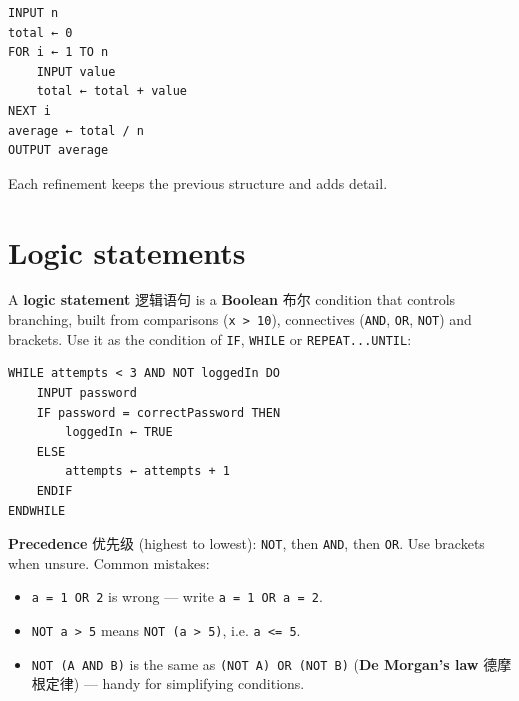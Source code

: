 \documentclass[11pt]{article}
\begin{document}
\begin{Verbatim}
INPUT n
total ← 0
FOR i ← 1 TO n
    INPUT value
    total ← total + value
NEXT i
average ← total / n
OUTPUT average
\end{Verbatim}

Each refinement keeps the previous structure and adds detail.

\section*{Logic statements}

A \textbf{logic statement} 逻辑语句 is a \textbf{Boolean} 布尔 condition that controls branching, built from comparisons (\texttt{x \textgreater{} 10}), connectives (\texttt{AND}, \texttt{OR}, \texttt{NOT}) and brackets. Use it as the condition of \texttt{IF}, \texttt{WHILE} or \texttt{REPEAT...UNTIL}:

\begin{Verbatim}
WHILE attempts < 3 AND NOT loggedIn DO
    INPUT password
    IF password = correctPassword THEN
        loggedIn ← TRUE
    ELSE
        attempts ← attempts + 1
    ENDIF
ENDWHILE
\end{Verbatim}

\textbf{Precedence} 优先级 (highest to lowest): \texttt{NOT}, then \texttt{AND}, then \texttt{OR}. Use brackets when unsure. Common mistakes:

\begin{itemize}
\item \texttt{a = 1 OR 2} is wrong — write \texttt{a = 1 OR a = 2}.

\item \texttt{NOT a \textgreater{} 5} means \texttt{NOT (a \textgreater{} 5)}, i.e. \texttt{a \textless{}= 5}.

\item \texttt{NOT (A AND B)} is the same as \texttt{(NOT A) OR (NOT B)} (\textbf{De Morgan's law} 德摩根定律) — handy for simplifying conditions.

\end{itemize}
\end{document}
